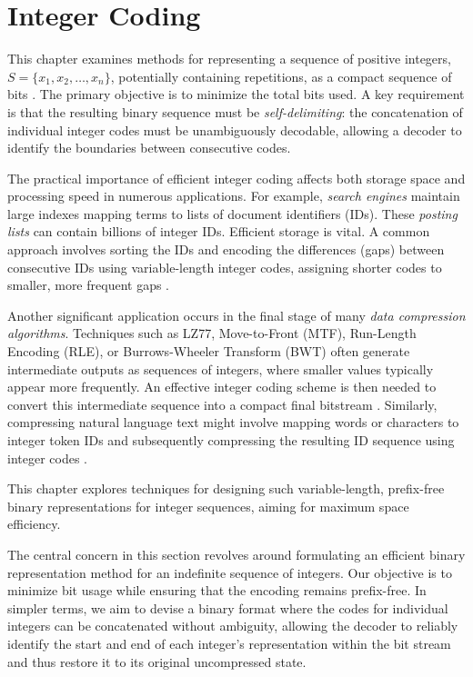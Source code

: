 \clearpage
\section{Integer Coding} \label{sec:integer_coding}

\noindent This chapter examines methods for representing a sequence of positive integers, $S = \{x_1, x_2, \ldots, x_n\}$, potentially containing repetitions, as a compact sequence of bits \cite{ferragina2023pearls}. The primary objective is to minimize the total bits used. A key requirement is that the resulting binary sequence must be \emph{self-delimiting}: the concatenation of individual integer codes must be unambiguously decodable, allowing a decoder to identify the boundaries between consecutive codes.

\noindent The practical importance of efficient integer coding affects both storage space and processing speed in numerous applications. For example, \emph{search engines} maintain large indexes mapping terms to lists of document identifiers (IDs). These \emph{posting lists} can contain billions of integer IDs. Efficient storage is vital. A common approach involves sorting the IDs and encoding the differences (gaps) between consecutive IDs using variable-length integer codes, assigning shorter codes to smaller, more frequent gaps \cite{ferragina2023pearls, witten1999managing}.

\noindent Another significant application occurs in the final stage of many \emph{data compression algorithms}. Techniques such as LZ77, Move-to-Front (MTF), Run-Length Encoding (RLE), or Burrows-Wheeler Transform (BWT) often generate intermediate outputs as sequences of integers, where smaller values typically appear more frequently. An effective integer coding scheme is then needed to convert this intermediate sequence into a compact final bitstream \cite{ferragina2023pearls}. Similarly, compressing natural language text might involve mapping words or characters to integer token IDs and subsequently compressing the resulting ID sequence using integer codes \cite{ferragina2023pearls}.

\noindent This chapter explores techniques for designing such variable-length, prefix-free binary representations for integer sequences, aiming for maximum space efficiency.


\noindent The central concern in this section revolves around formulating an efficient binary representation method for an indefinite sequence of integers. Our objective is to minimize bit usage while ensuring that the encoding remains prefix-free. In simpler terms, we aim to devise a binary format where the codes for individual integers can be concatenated without ambiguity, allowing the decoder to reliably identify the start and end of each integer's representation within the bit stream and thus restore it to its original uncompressed state.

